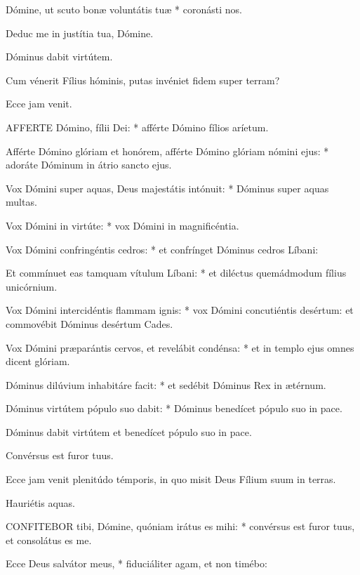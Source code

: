 Dómine, ut scuto bonæ voluntátis tuæ * coronásti nos.

 Deduc me in justítia tua, Dómine.

 Dóminus dabit virtútem.

  Cum vénerit Fílius hóminis, putas invéniet fidem super terram?

 Ecce jam venit.


\lettrine[lines=2]{A}{FFERTE} Dómino, fílii Dei: * afférte Dómino fílios aríetum.

Afférte Dómino glóriam et honórem, afférte Dómino glóriam nómini ejus: * adoráte Dóminum in átrio sancto ejus.

Vox Dómini super aquas, Deus majestátis intónuit: * Dóminus super aquas multas.

Vox Dómini in virtúte: * vox Dómini in magnificéntia.

Vox Dómini confringéntis cedros: * et confrínget Dóminus cedros Líbani:

Et commínuet eas tamquam vítulum Líbani: * et diléctus quemádmodum fílius unicórnium.

Vox Dómini intercidéntis flammam ignis: * vox Dómini concutiéntis desértum: et commovébit Dóminus desértum Cades.

Vox Dómini præparántis cervos, et revelábit condénsa: * et in templo ejus omnes dicent glóriam.

Dóminus dilúvium inhabitáre facit: * et sedébit Dóminus Rex in ætérnum.

Dóminus virtútem pópulo suo dabit: * Dóminus benedícet pópulo suo in pace.

 Dóminus dabit virtútem et benedícet pópulo suo in pace.

 Convérsus est furor tuus.

  Ecce jam venit plenitúdo témporis, in quo misit Deus Fílium suum in terras.

 Hauriétis aquas.


\lettrine[lines=2]{C}{ONFITEBOR} tibi, Dómine, quóniam irátus es mihi: * convérsus est furor tuus, et consolátus es me.

Ecce Deus salvátor meus, * fiduciáliter agam, et non timébo:

